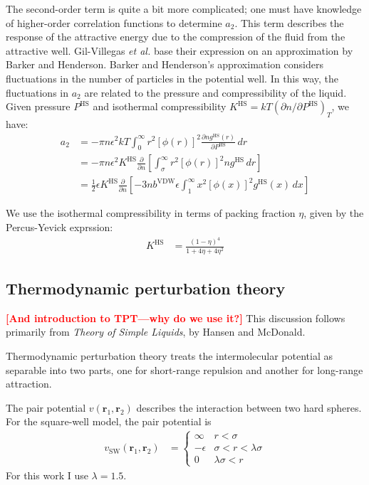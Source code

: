 \documentclass[letterpaper,twocolumn,amsmath,amssymb,prb]{revtex4-1}
\newcommand{\1}{\ensuremath{\textbf{r}_1}}
\newcommand{\2}{\ensuremath{\textbf{r}_2}}
\newcommand{\3}{\ensuremath{\textbf{r}_3}}
\newcommand{\4}{\ensuremath{\textbf{r}_4}}
\newcommand{\fixme}[1]{\textcolor{red}{\textbf{[#1]}}}
\begin{document}
The second-order term is quite a bit more complicated; one must have knowledge of higher-order correlation functions to determine $a_2$. This term describes the response of the attractive energy due to the compression of the fluid from the attractive well. Gil-Villegas \emph{et al.} base their expression on an approximation by Barker and Henderson.\cite{Barker67} Barker and Henderson's approximation considers fluctuations in the number of particles in the potential well. In this way, the fluctuations in $a_2$ are related to the pressure and compressibility of the liquid. Given pressure $P^\text{HS}$ and isothermal compressibility $K^\text{HS} = kT\left(\partial n  /\partial P^\text{HS}\right)_T$, we have:
\begin{align}
  a_2 &= -\pi n \epsilon^2kT\int_0^\infty r^2\left[\phi(r)\right]^2\frac{\partial n  g^\text{HS}(r)}{\partial P^\text{HS}}\,dr \\
  &= -\pi n \epsilon^2K^\text{HS}\frac{\partial}{\partial n }\left[\int_\sigma^\infty r^2\left[\phi(r)\right]^2 n  g^\text{HS}\,dr\right] \\
  &= \frac{1}{2}\epsilon K^\text{HS}\frac{\partial}{\partial n }\left[-3 n  b^\text{VDW}\epsilon\int_1^\infty x^2\left[\phi(x)\right]^2 g^\text{HS}(x)\,dx \right]
\end{align}

We use the isothermal compressibility in terms of packing fraction $\eta$, given by the Percus-Yevick exprssion:\cite{Barker76}
\begin{align}
  K^\text{HS} &= \frac{\left(1 - \eta\right)^4}{1 + 4\eta + 4\eta^2}
\end{align}

\subsection{Thermodynamic perturbation theory}\label{subsec:TPT}


\fixme{And introduction to TPT---why do we use it?}
This discussion follows primarily from \textit{Theory of Simple Liquids}, by Hansen and McDonald\cite{Hansen06}.

Thermodynamic perturbation theory treats the intermolecular potential as separable into two parts, one for short-range repulsion and another for long-range attraction.

The pair potential $v(\1,\2)$ describes the interaction between two hard spheres. For the square-well model, the pair potential is
\begin{align}
  v_\text{SW}(\1,\2) &=
    \begin{cases}
      \infty & r < \sigma \\
      -\epsilon & \sigma < r < \lambda\sigma \\
      0 & \lambda\sigma < r
    \end{cases}
\end{align}
For this work I use $\lambda = 1.5$.
\end{document}
